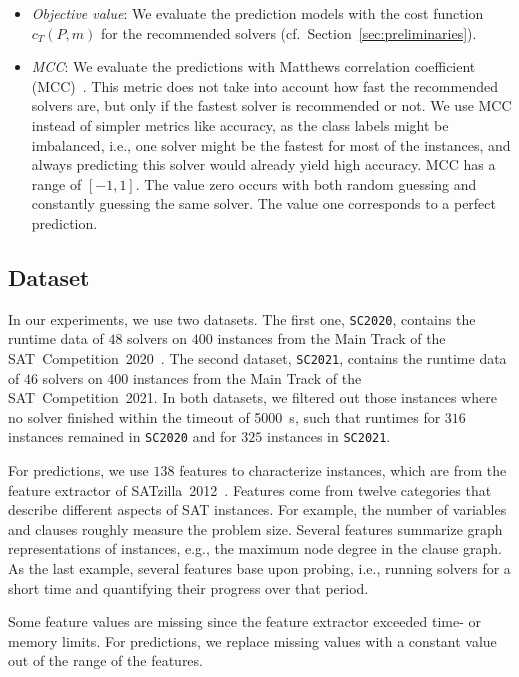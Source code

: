 \documentclass[a4paper,USenglish,pdfa]{lipics-v2021} %
\begin{document}
\begin{itemize}
	\item \emph{Objective value}:
	We evaluate the prediction models with the cost function $c_{T}(P,m)$ for the recommended solvers (cf.~Section~\ref{sec:preliminaries}). 
	\item \emph{MCC}:
	We evaluate the predictions with Matthews correlation coefficient (MCC)~\cite{matthews1975comparison,gorodkin2004comparing}.
	This metric does not take into account how fast the recommended solvers are, but only if the fastest solver is recommended or not.
	We use MCC instead of simpler metrics like accuracy, as the class labels might be imbalanced, i.e., one solver might be the fastest for most of the instances, and always predicting this solver would already yield high accuracy.
	MCC has a range of $[-1,1]$. 
	The value zero occurs with both random guessing and constantly guessing the same solver.
	The value one corresponds to a perfect prediction.
\end{itemize}

\subsection{Dataset}

In our experiments, we use two datasets. 
The first one, \texttt{SC2020}, contains the runtime data of $48$ solvers on $400$ instances from the Main Track of the SAT~Competition~2020~\cite{balyo2020proceedings,SC2020:AIJ}.
The second dataset, \texttt{SC2021}, contains the runtime data of $46$ solvers on $400$ instances from the Main Track of the SAT~Competition~2021. 
In both datasets, we filtered out those instances where no solver finished within the timeout of 5000~s, such that runtimes for $316$ instances remained in \texttt{SC2020} and for $325$ instances in \texttt{SC2021}.

For predictions, we use $138$ features to characterize instances, which are from the feature extractor of SATzilla~2012~\cite{xu2012features}. 
Features come from twelve categories that describe different aspects of SAT instances.
For example, the number of variables and clauses roughly measure the problem size.
Several features summarize graph representations of instances, e.g., the maximum node degree in the clause graph.
As the last example, several features base upon probing, i.e., running solvers for a short time and quantifying their progress over that period.

Some feature values are missing since the feature extractor exceeded time- or memory limits.
For predictions, we replace missing values with a constant value out of the range of the features.
\end{document}
